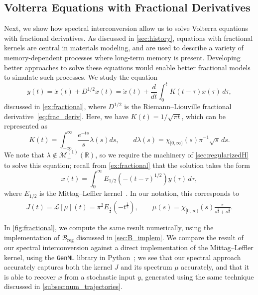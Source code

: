 \documentclass{cams-l} %
\newcommand{\dave}[1]{#1}\newcommand{\davebegin}{}\newcommand{\daveend}{}\newcommand{\george}[1]{#1}
\newcommand{\RR}{\mathbb R}
\newcommand{\cL}{\mathcal L}
\newcommand{\cM}{\mathcal M}
\newcommand{\cB}{\mathcal B}
\theoremstyle{definition}
\theoremstyle{remark}
\numberwithin{equation}{section}
\begin{document}
\subsection{Volterra Equations with Fractional Derivatives}\label{sec:fractional}
Next, we show how spectral interconversion allow us to solve Volterra equations with fractional derivatives. \george{As discussed in \cref{sec:history}, equations with fractional kernels are central in materials modeling, and are used to describe a variety of memory-dependent processes where long-term memory is present. Developing better approaches to solve these equations would enable better fractional models to simulate such processes.} We study the equation
\begin{equation}\label{eq:num_fracderiv}
    y(t) = \dot{x}(t) + D^{1/2}x(t) = \dot{x}(t) + \frac{d}{dt}\int_0^t K(t-\tau)x(\tau)\,d\tau,
\end{equation}
discussed in \cref{ex:fractional}, where $D^{1/2}$ is the Riemann--Liouville \dave{fractional} derivative~\cref{eq:frac_deriv}. Here, we have $K(t) = 1/\sqrt{\pi t}$, which can be represented as
\begin{equation}\label{eq:frac_lambda_laplace}
    K(t) = \int_{-\infty}^\infty \frac{e^{-ts}}{s}\lambda(s)ds, \qquad d\lambda(s) = \chi_{[0,\infty)}(s)\pi^{-1}\sqrt{s}\,ds.
\end{equation}
We note that $\lambda\notin\cM_+^{(1)}(\RR)$, so we require the machinery of \cref{sec:regularizedH} to solve this equation; recall from \cref{ex:fractional} that the solution takes the form
\[x(t) = \int_0^\infty E_{1/2}(-(t-\tau)^{1/2})y(\tau)\,d\tau,\]
where $E_{1/2}$ is the Mittag--Leffler kernel~\cite{haubold2011mittag}. In our notation, this corresponds to
\begin{align*}
    J(t) = \cL[\mu](t) = \pi^2E_\frac{1}{2}(-t^\frac{1}{2}), \qquad \mu(s) = \chi_{[0,\infty)}(s)\frac{\pi}{s^\frac{1}{2} + s^\frac{3}{2}}.
\end{align*}

In \cref{fig:fractional}, we compute the same result numerically, using the implementation of $\cB_\mathrm{reg}$ discussed in \cref{sec:B_implem}. We compare the result of our spectral interconversion against a direct implementation of the Mittag--Leffler kernel, using the \texttt{GenML} library in Python~\cite{qu2024genml}; we see that our spectral approach accurately captures both the kernel $J$ and its spectrum $\mu$ accurately, and that it is able to recover $x$ from a stochastic input $y$, generated using the same technique discussed in \cref{subsec:num_trajectories}.
\end{document}
